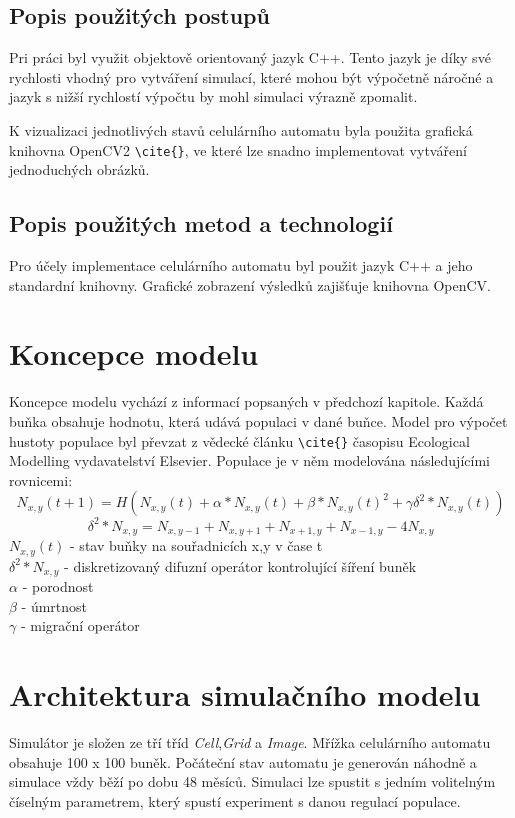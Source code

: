 \documentclass[a4paper,11pt]{article}
\begin{document}
\subsection{Popis použitých postupů}
Pri práci byl využit objektově orientovaný jazyk C++. Tento jazyk je díky své rychlosti vhodný pro vytváření simulací, které mohou být výpočetně náročné a jazyk s nižší rychlostí výpočtu by mohl simulaci výrazně zpomalit.


K vizualizaci jednotlivých stavů celulárního automatu byla použita grafická knihovna OpenCV2 \verb|\cite{}|, ve které lze snadno implementovat vytváření jednoduchých obrázků.

\subsection{Popis použitých metod a technologií}
Pro účely implementace celulárního automatu byl použit jazyk C++ a jeho standardní knihovny. Grafické zobrazení výsledků zajišťuje knihovna OpenCV.

\section{Koncepce modelu}
Koncepce modelu vychází z informací popsaných v předchozí kapitole. Každá buňka obsahuje hodnotu, která udává populaci v dané buňce. Model pro výpočet hustoty populace byl převzat z vědecké článku \verb|\cite{}| časopisu Ecological Modelling vydavatelství Elsevier. Populace je v něm modelována následujícími rovnicemi:
\begin{equation}
N_{x,y}(t+1) = H(N_{x,y}(t) + \alpha*N_{x,y}(t) + \beta*N_{x,y}(t)^2 + \gamma\delta^2*N_{x,y}(t))
\end{equation}
\begin{equation}
\delta^2*N_{x,y} = N_{x,y-1} + N_{x,y+1} + N_{x+1,y} + N_{x-1,y} - 4N_{x,y}
\end{equation}
\( N_{x,y}(t) \) - stav buňky na souřadnicích x,y v čase t\ \\
\( \delta^2*N_{x,y} \) - diskretizovaný difuzní operátor kontrolující šíření buněk \\
\( \alpha \) - porodnost \\
\( \beta \) - úmrtnost \\
\( \gamma \) - migrační operátor\\

\section{Architektura simulačního modelu}
Simulátor je složen ze tří tříd \emph{Cell},\emph{Grid} a \emph{Image}. Mřížka celulárního automatu obsahuje 100 x 100 buněk. Počáteční stav automatu je generován náhodně a simulace vždy běží po dobu 48 měsíců. Simulaci lze spustit s jedním volitelným číselným parametrem, který spustí experiment s danou regulací populace.
\end{document}
